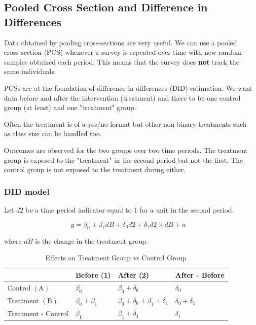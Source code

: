 \documentclass[11pt]{article}
\begin{document}
\subsection{Pooled Cross Section and Difference in Differences}

Data obtained by pooling cross-sections are very useful. We can use a pooled cross-section (PCS) whenever a survey is repeated over time with new random samples obtained each period. This means that the survey does \textbf{not} track the same individuals.

PCSs are at the foundation of difference-in-differences (DID) estimation. We want data before and after the intervention (treatment) and there to be one control group (at least) and one "treatment" group.

Often the treatment is of a yes/no format but other non-binary treatments such as class size can be handled too.

Outcomes are observed for the two groups over two time periods. The treatment group is exposed to the "treatment" in the second period but not the first. The control group is not exposed to the treatment during either.

\subsubsection{DID model}

Let $d2$ be a time period indicator equal to 1 for a unit in the second period.

\begin{equation}
    y = \beta_0 + \beta_1 dB + \delta_0 d2 + \delta_1 d2 \times dB + u
\end{equation}

where $dB$ is the change in the treatment group.

\begin{table}[h]
    \centering
    \begin{tabular}{|l|l|l|l|}
\hline & Before (1) & After (2) & After - Before \\
\hline Control $(\mathrm{A})$ & $\beta_0$ & $\beta_0+\delta_0$ & $\delta_0$ \\
\hline Treatment $(\mathrm{B})$ & $\beta_0+\beta_1$ & $\beta_0+\delta_0+\beta_1+\delta_1$ & $\delta_0+\delta_1$ \\
\hline Treatment - Control & $\beta_1$ & $\beta_1+\delta_1$ & $\delta_1$ \\
\hline
\end{tabular}
    \caption{Effects on Treatment Group vs Control Group}
    \label{tab:diff in diff}
\end{table}
\end{document}
